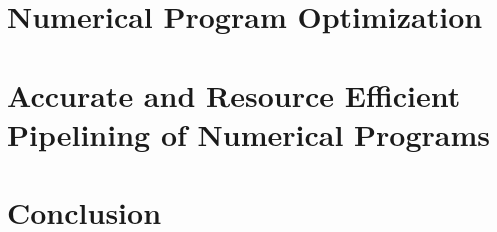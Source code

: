 








\chapter{Numerical Program Optimization}
\label{chp:progopt}












\chapter{Accurate and Resource Efficient Pipelining of Numerical Programs}
\label{chp:latopt}











\chapter{Conclusion}
\label{chp:conclusion}



\cleardoublepage{}


{%
\renewcommand{\bibfont}{\normalfont\small}
\setlength{\biblabelsep}{0pt}
\setlength{\bibitemsep}{0.5\baselineskip plus 0.5\baselineskip}
\printbibliography[]
}

% 

% 

\begin{appendices}
    \addappheadtotoc%
    \makeatletter
    \makeatother
    
    
    
\end{appendices}


